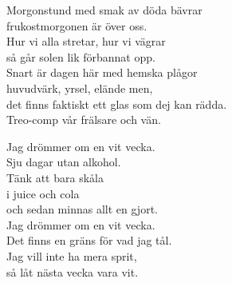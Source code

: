 \documentclass[a6paper,10pt]{article}
\begin{document}
\setlength{\oddsidemargin}{-0.37in}
\begin{center}
\end{center}
\begin{lyrics}
Morgonstund med smak av döda bävrar\\
frukostmorgonen är över oss.\\
Hur vi alla stretar, hur vi vägrar\\
så går solen lik förbannat opp.
\vspace{5pt}\\
Snart är dagen här med hemska plågor\\
huvudvärk, yrsel, elände men,\\
det finns faktiskt ett glas som dej kan rädda.\\
Treo-comp vår frälsare och vän. 
\end{lyrics}
\vspace{40pt}
\begin{center}
\end{center}
\begin{lyrics}
Jag drömmer om en vit vecka.\\
Sju dagar utan alkohol.\\
Tänk att bara skåla\\
i juice och cola\\
och sedan minnas allt en gjort.
\vspace{5pt}\\
Jag drömmer om en vit vecka.\\
Det finns en gräns för vad jag tål.\\
Jag vill inte ha mera sprit,\\
så låt nästa vecka vara vit.
\end{lyrics}
\end{document}
